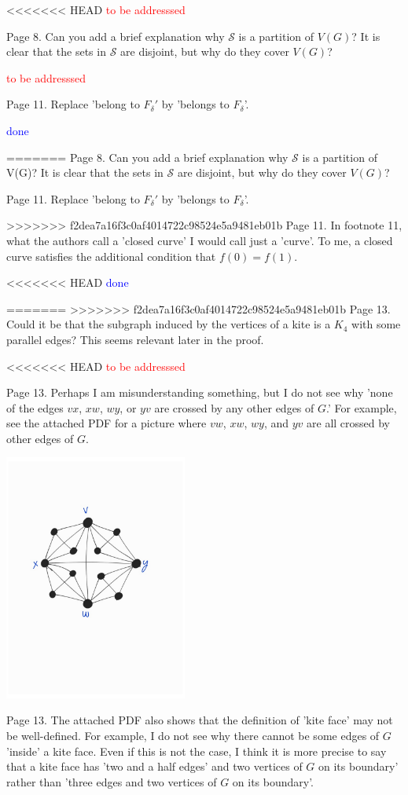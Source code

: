 \documentclass[12pt]{article}
\newcommand{\done}{\textcolor{blue}{done}}
\newcommand{\tba}{\textcolor{red}{to be addresssed}}
\begin{document}
<<<<<<< HEAD
\tba

Page 8.  Can you add a brief explanation why $\mathcal{S}$ is a
partition of $V(G)$?  It is clear that the sets in $\mathcal{S}$ are
disjoint, but why do they cover $V(G)$?

\tba

Page 11. Replace 'belong to $F_\delta'$ by 'belongs to $F_\delta$'.

\done

=======
Page 8.  Can you add a brief explanation why $\mathcal{S}$ is a
partition of V(G)?  It is clear that the sets in $\mathcal{S}$ are
disjoint, but why do they cover $V(G)$?

Page 11. Replace 'belong to $F_\delta'$ by 'belongs to $F_\delta$'.

>>>>>>> f2dea7a16f3c0af4014722c98524e5a9481eb01b
Page 11. In footnote 11, what the authors call a 'closed curve' I
would call just a 'curve'.  To me, a closed curve satisfies the
additional condition that $f(0)=f(1)$.

<<<<<<< HEAD
\done

=======
>>>>>>> f2dea7a16f3c0af4014722c98524e5a9481eb01b
Page 13. Could it be that the subgraph induced by the vertices of a
kite is a $K_4$ with some parallel edges?  This seems relevant later in
the proof.

<<<<<<< HEAD
\tba

Page 13. Perhaps I am misunderstanding something, but I do not see why
'none of the edges $vx$, $xw$, $wy$, or $yv$ are crossed by any other edges of
$G$.'  For example, see the attached PDF for a picture where $vw$, $xw$, $wy$,
and $yv$ are all crossed by other edges of $G$.

\includegraphics[width=60mm]{kite}

Page 13. The attached PDF also shows that the definition of 'kite
face' may not be well-defined.  For example, I do not see why there
cannot be some edges of $G$ 'inside' a kite face.  Even if this is not
the case, I think it is more precise to say that a kite face has 'two
and a half edges' and two vertices of $G$ on its boundary' rather than
'three edges and two vertices of $G$ on its boundary'.
\end{document}
